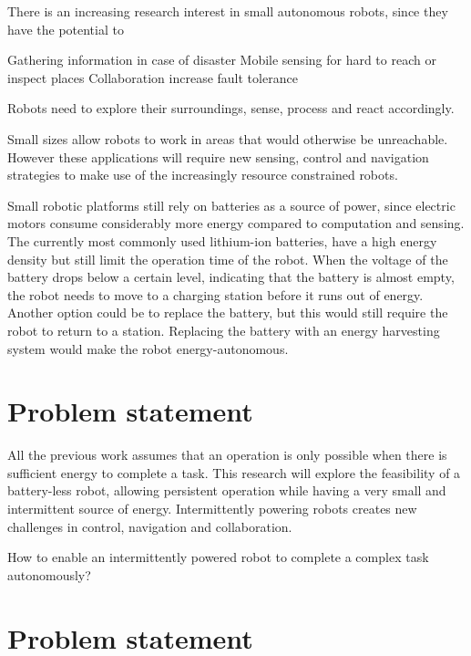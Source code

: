 There is an increasing research interest in small autonomous robots, since they have the potential to 



Gathering information in case of disaster
Mobile sensing for hard to reach or inspect places
Collaboration increase fault tolerance


Robots need to explore their surroundings, sense, process and react accordingly.	


Small sizes allow robots to work in areas that would otherwise be unreachable. 
However these applications will require new sensing, control and navigation strategies to make use of the increasingly resource constrained robots.

Small robotic platforms still rely on batteries as a source of power, since electric motors consume considerably more energy compared to computation and sensing.
The currently most commonly used lithium-ion batteries, have a high energy density but still limit the operation time of the robot.
When the voltage of the battery drops below a certain level, indicating that the battery is almost empty, the robot needs to move to a charging station before it runs out of energy.
Another option could be to replace the battery, but this would still require the robot to return to a station.
Replacing the battery with an energy harvesting system would make the robot energy-autonomous. 


\section{Problem statement}

All the previous work assumes that an operation is only possible when there is sufficient energy to complete a task.
This research will explore the feasibility of a battery-less robot, allowing persistent operation while having a very small and intermittent source of energy.
Intermittently powering robots creates new challenges in control, navigation and collaboration.


How to enable an intermittently powered robot to complete a complex task autonomously?

\section{Problem statement}

